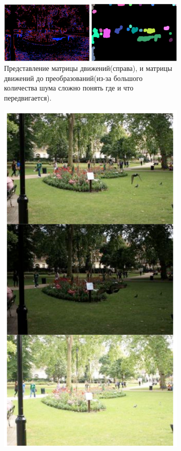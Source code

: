 \begin{figure}[!tbp]
  \centering
  \begin{subfigure}{.5\textwidth}
    \includegraphics[width=\textwidth]{img/motionMap.png}
    \caption{ Представление матрицы движений(справа), и матрицы движений до преобразований(из-за большого количества шума сложно понять где и что передвигается).}
  \end{subfigure}\hfill
  \begin{subfigure}{.3\textwidth}
    \includegraphics[width=\textwidth]{img/exposureSet.png}

\end{subfigure}
\end{figure}
